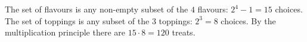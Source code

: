 The set of flavours is any non-empty subset of the $4$ flavours: $2^4-1=15$ choices. The set of toppings is any subset of the $3$ toppings: $2^3=8$ choices. By the multiplication principle there are $15\cdot8=\boxed{120}$ treats.
